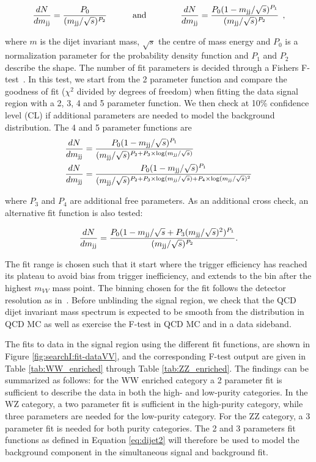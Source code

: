 \begin{equation}
\label{eq:dijet1}
\frac{dN}{dm_\mathrm{jj}}= \frac{ P_0 } { (m_\mathrm{jj}/\sqrt{s})^{P_2} }\quad\quad\quad{\rm and}
\quad\quad\quad\quad
\frac{dN}{dm_\mathrm{jj}}= \frac{ P_0(1-m_\mathrm{jj}/\sqrt{s})^{P_1} } { (m_\mathrm{jj}/\sqrt{s})^{P_2} }\:\:,
\end{equation}

where $m$ is the dijet invariant mass, $\sqrt{s}$ the centre of mass energy and $P_0$ is a normalization parameter for the probability density function and $P_1$ and $ P_2$ describe the shape. The number of fit parameters is decided through a Fishers F-test~\cite{RePEc:bla:istatr:v:80:y:2012:i:3:p:491-491}. In this test, we start from the 2 parameter function and compare the goodness of fit ($\chi^2$ divided by degrees of freedom) when fitting the data signal region with a 2, 3, 4 and 5 parameter function. We then check at 10\% confidence level (CL) if additional parameters are needed to model the background distribution. The 4 and 5 parameter functions are
\begin{align}
\label{eq:dijet2}
\frac{dN}{d m_\mathrm{jj}} &= \frac{ P_0(1-m_\mathrm{jj}/\sqrt{s})^{P_1} } {(m_\mathrm{jj}/\sqrt{s})^{P_2+P_3\times\log(m_\mathrm{jj}/\sqrt{s})} }\\
\frac{dN}{d m_\mathrm{jj}} &= \frac{ P_0(1-m_\mathrm{jj}/\sqrt{s})^{P_1} } {(m_\mathrm{jj}/\sqrt{s})^{P_2+P_3\times\log(m_\mathrm{jj}/\sqrt{s})+P_4\times\log(m_\mathrm{jj}/\sqrt{s})^2} }
\end{align}

where $P_3$ and $P_4$ are additional free parameters. As an additional cross check, an alternative fit function is also tested:

\begin{equation}
\label{eq:dijet4}
\frac{dN}{dm_\mathrm{jj}} = \frac{ P_0(1-m_\mathrm{jj} / \sqrt{s}+P_3(m_\mathrm{jj} / \sqrt{s})^2)^{P_1} } { (m_\mathrm{jj}/\sqrt{s})^{P_2} }.
\end{equation}

The fit range is chosen such that it start where the trigger efficiency has reached its plateau to avoid bias from trigger inefficiency, and extends to the bin after the highest $m_{VV}$ mass point. The binning chosen for the fit follows the detector resolution as in~\cite{Chatrchyan:2012ypy,CMS-PAS-EXO-12-059}.
Before unblinding the signal region, we check that the QCD dijet invariant mass spectrum is expected to be smooth from the distribution in QCD MC as well as exercise the F-test in QCD MC and in a data sideband.\par
The fits to data in the signal region using the different fit functions, are shown in Figure \ref{fig:searchI:fit-dataVV}, and the corresponding F-test output are given in Table \ref{tab:WW_enriched} through Table \ref{tab:ZZ_enriched}. The findings can be summarized as follows: for the WW enriched category a 2 parameter fit is sufficient to describe the data in both the high- and low-purity categories. In the WZ category, a two parameter fit is sufficient in the high-purity category, while three parameters are needed for the low-purity category. For the ZZ category, a 3 parameter fit is needed for both purity categories. The 2 and 3 parameters fit functions as defined in Equation \ref{eq:dijet2} will therefore be used to model the background component in the simultaneous signal and background fit.
\par

